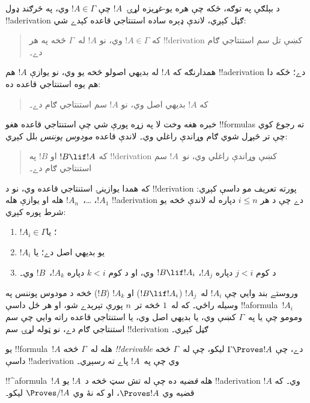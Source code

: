 \documentclass[../../../include/open-logic-section]{subfiles}
\begin{document}
د بېلګې په توګه، ځکه چې هره يو-غړيزه لړۍ~$!A$ چې
$!A \in \Gamma$ وي، په څرګند ډول !!a{derivation} ګڼل کېږي، لاندې
ډېره ساده استنتاجي قاعده کېدے شي:
\begin{quote}
  که $!A \in \Gamma$ وي، نو $!A$ له~$\Gamma$ څخه په هر
  !!{derivation} کښې تل سم استنتاجي ګام دے۔
\end{quote}
همدارنګه که $!A$ له بديهي اصولو څخه يو وي، نو يوازې $!A$ هم
!!a{derivation} دے؛ ځکه دا هم يوه استنتاجي قاعده ده:
\begin{quote}
  که $!A$ بديهي اصل وي، نو $!A$ سم استنتاجي ګام دے۔
\end{quote}
خبره هغه وخت لا په زړه پورې شي چې استنتاجي قاعده هغو !!{formula}s
ته رجوع کوي چې تر څېړل شوي ګام وړاندې راغلي وي۔ لاندې قاعده
\emph{مودوس پوننس} بلل کېږي:
\begin{quote}
  که $!B \lif !A$ او $!B$ په !!{derivation} کښې وړاندې راغلي وي،
  نو~$!A$ سم استنتاجي ګام دے۔
\end{quote}
که همدا يوازينۍ استنتاجي قاعده وي، نو د !!{derivation} پورته تعريف
مو داسې کېږي: $!A_1$، \dots،~$!A_n$ هله او يوازې هله
!!a{derivation} دے چې د هر $i \le n$ دپاره له لاندې څخه يو شرط
پوره کېږي:
\begin{enumerate}
\item $!A_i \in \Gamma$؛ يا
\item $!A_i$ يو بديهي اصل دے؛ يا
\item د کوم $j < i$ دپاره $!A_j$، $!B \lif !A_i$ وي، او د کوم
  $k < i$ دپاره $!A_k$،~$!B$ وي۔
\end{enumerate}
وروستے بند وايي چې $!A_i$ له~$!A_j$ ($!B \lif !A_i$) او
$!A_k$ ($!B$) څخه د مودوس پوننس په وسيله راځي۔ که له~$1$ څخه
تر~$n$ پورې تېرېدے شو، او هر ځل داسې !!a{formula}~$!A_i$ ومومو
چې يا په~$\Gamma$ کښې وي، يا بديهي اصل وي، يا استنتاجي قاعده راته
وايي چې سم استنتاجي ګام دے، نو ټوله لړۍ سم !!{derivation} ګڼل کېږي۔

\begin{defn}[!!^{derivability}]
يو !!{formula}~$!A$ هله له~$\Gamma$ څخه \emph{!!{derivable}} دے،
چې $\Gamma \Proves !A$ ليکو، چې له~$\Gamma$ څخه داسې
!!a{derivation} وي چې په~$!A$ پاے ته رسېږي۔
\end{defn}

\begin{defn}[قضيې]
!!^a{formula}~$!A$ هله \emph{قضيه} ده چې له تش سټ څخه د~$!A$ يو
!!a{derivation} وي۔ که $!A$ قضيه وي $\Proves !A$، او که نۀ وي
$\Proves/ !A$ ليکو۔
\end{defn}
\end{document}
